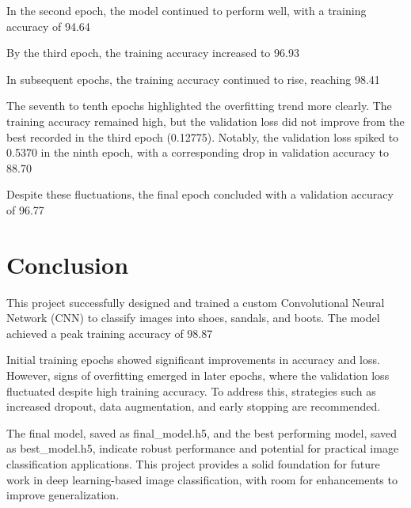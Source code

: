 \documentclass{article}
\begin{document}
    In the second epoch, the model continued to perform well, with a training accuracy of 94.64%

    By the third epoch, the training accuracy increased to 96.93%

    In subsequent epochs, the training accuracy continued to rise, reaching 98.41%

    The seventh to tenth epochs highlighted the overfitting trend more clearly. The training accuracy remained high, but the validation loss did not improve from the best recorded in the third epoch (0.12775). Notably, the validation loss spiked to 0.5370 in the ninth epoch, with a corresponding drop in validation accuracy to 88.70%

    Despite these fluctuations, the final epoch concluded with a validation accuracy of 96.77%

\section{Conclusion}
    
    This project successfully designed and trained a custom Convolutional Neural Network (CNN) to classify images into shoes, sandals, and boots. The model achieved a peak training accuracy of 98.87%

    Initial training epochs showed significant improvements in accuracy and loss. However, signs of overfitting emerged in later epochs, where the validation loss fluctuated despite high training accuracy. To address this, strategies such as increased dropout, data augmentation, and early stopping are recommended.

    The final model, saved as final\_model.h5, and the best performing model,   saved as best\_model.h5, indicate robust performance and potential for practical image classification applications. This project provides a solid foundation for future work in deep learning-based image classification, with room for enhancements to improve generalization.
\end{document}
